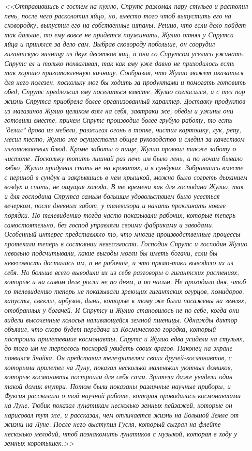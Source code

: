 \documentclass[12pt]{article}
\begin{document}
\textit{<<Отправившись с гостем на кухню, Спрутс разломал пару стульев и растопил печь, после чего расколотил яйцо, но, вместо того чтоб выпустить его на сковородку, выпустил его на собственные штаны. Решив, что если дело пойдет так дальше, то ему вовсе не придется поужинать, Жулио отнял у Спрутса яйца и принялся за дело сам. Выбрав сковороду побольше, он соорудил гигантскую яичницу из двух десятков яиц, и они со Спрутсом уселись ужинать. Спрутс ел и только похваливал, так как ему уже давно не приходилось есть так хорошо приготовленную яичницу. Сообразив, что Жулио может оказаться для него полезен, поскольку мог бы ходить за продуктами и помогать готовить обед, Спрутс предложил ему поселиться вместе. Жулио согласился, и с тех пор жизнь Спрутса приобрела более организованный характер. Доставку продуктов из магазинов Жулио целиком взял на себя, завтраки же, обеды и ужины они готовили вместе, причем Спрутс производил более грубую работу, то есть "делал" дрова из мебели, разжигал огонь в топке, чистил картошку, лук, репу, месил тесто; Жулио же осуществлял общее руководство и следил за качеством изготовляемых блюд. Кроме заботы о пище, Жулио проявил также заботу о чистоте. Поскольку топить лишний раз печь им было лень, а по ночам бывало зябко, Жулио придумал спать не на кроватях, а в сундуках. Забравшись вместе с периной в сундук и закрывшись в нем крышкой, можно было согреть дыханием воздух и спать, не ощущая холода. В те времена как для господина Жулио, так и для господина Спрутса самым большим удовольствием было усесться вечерком, после дневных забот, у телевизора и начать проклинать новые порядки. По телевидению тогда часто показывали рабочих, которые теперь самостоятельно, без господ управляли своими фабриками и заводами. Особенный интерес представляло то, что многие производственные процессы протекали теперь в состоянии невесомости. Господин Спрутс и господин Жулио невольно подсчитывали, какие выгоды могли бы иметь богачи, если бы невесомость досталась им, а не рабочим, и это прямо-таки выводило их из себя. Но больше всего выводили их из себя разговоры о гигантских растениях, которые и на самом деле росли не по дням, а по часам. Не проходило дня, чтоб по телевидению теперь не показывали зреющих гигантских огурцов, помидоров, капусты, свеклы, арбузов, дынь, которые к тому же были посажены на землях, отобранных у богачей. И Спрутсу и Жулио становилось не по себе, когда они видели высоченные колосья наливающейся земной пшеницы. Однажды диктор объявил, что скоро будет передача из Космического городка, который построили прилетевшие космонавты. Спрутс и Жулио едва усидели на стульях, до того им не терпелось поскорей увидеть своих врагов. Наконец на экране появился Знайка. Он представил телезрителям своих друзей-космонавтов, с которыми прилетел на Луну, показал несколько маленьких уютных домиков, которые космонавты построили для себя сами. Зрители даже увидели один такой домик внутри. Потом были показаны различные научные приборы, и Фуксия рассказала о той научной работе, которая проводилась космонавтами на Луне. Тюбик показал лунатикам несколько земных пейзажей, которые он нарисовал тут же, и рассказал, чем отличается жизнь на Большой Земле от жизни на Луне. После него выступил Гусля, который сыграл на флейте несколько мелодий, чтоб познакомить лунатиков с музыкой, которая в ходу у земных коротышек.>>}
\end{document}
